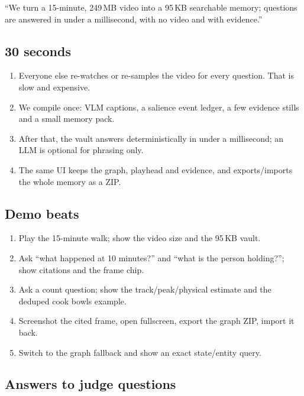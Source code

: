 \documentclass[10pt,a4paper]{article}
\begin{document}
“We turn a 15-minute, 249\,MB video into a 95\,KB searchable memory; questions are answered in under a millisecond, with no video and with evidence.”

\subsection*{30 seconds}

\begin{enumerate}[leftmargin=1.25em,itemsep=1pt]
  \item Everyone else re-watches or re-samples the video for every question. That is slow and expensive.
  \item We compile once: VLM captions, a salience event ledger, a few evidence stills and a small memory pack.
  \item After that, the vault answers deterministically in under a millisecond; an LLM is optional for phrasing only.
  \item The same UI keeps the graph, playhead and evidence, and exports/imports the whole memory as a ZIP.
\end{enumerate}

\subsection*{Demo beats}

\begin{enumerate}[leftmargin=1.25em,itemsep=1pt]
  \item Play the 15-minute walk; show the video size and the 95\,KB vault.
  \item Ask “what happened at 10 minutes?” and “what is the person holding?”; show citations and the frame chip.
  \item Ask a count question; show the track/peak/physical estimate and the deduped cook bowls example.
  \item Screenshot the cited frame, open fullscreen, export the graph ZIP, import it back.
  \item Switch to the graph fallback and show an exact state/entity query.
\end{enumerate}

\subsection*{Answers to judge questions}
\end{document}
